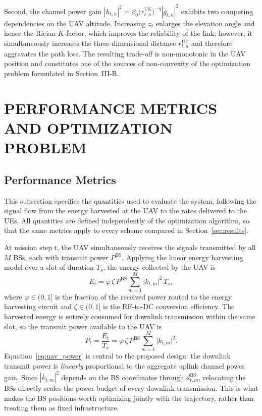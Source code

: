 \documentclass[conference]{IEEEtran}
\begin{document}
Second, the channel power gain
$|h_{t,n}|^{2}=\beta_{0}\big(r_{t,n}^{\mathrm{UE}}\big)^{-\eta}
|g_{t,n}|^{2}$ exhibits two competing dependencies on the UAV altitude.
Increasing $z_t$ enlarges the elevation angle and hence the Rician
$K$-factor, which improves the reliability of the link; however, it
simultaneously increases the three-dimensional distance
$r_{t,n}^{\mathrm{UE}}$ and therefore aggravates the path loss. The
resulting trade-off is non-monotonic in the UAV position and constitutes
one of the sources of non-convexity of the optimization problem
formulated in Section~III-B.



\section{PERFORMANCE METRICS AND OPTIMIZATION PROBLEM}

\subsection{Performance Metrics}
\label{subsec:performance_metrics}

This subsection specifies the quantities used to evaluate the system,
following the signal flow from the energy harvested at the UAV to the
rates delivered to the UEs. All quantities are defined independently of
the optimization algorithm, so that the same metrics apply to every
scheme compared in Section~\ref{sec:results}.

At mission step $t$, the UAV simultaneously receives the signals
transmitted by all $M$ BSs, each with transmit power $P^{\mathrm{BS}}$.
Applying the linear energy harvesting model over a slot of duration
$T_{s}$, the energy collected by the UAV is
\begin{equation}
\label{eq:harvested_energy}
E_{t}=\varphi\,\zeta\,P^{\mathrm{BS}}
      \sum_{m=1}^{M}\big|k_{t,m}\big|^{2}\,T_{s},
\end{equation}
where $\varphi\in(0,1]$ is the fraction of the received power routed to
the energy harvesting circuit and $\zeta\in(0,1]$ is the RF-to-DC
conversion efficiency. The harvested energy is entirely consumed for
downlink transmission within the same slot, so the transmit power
available to the UAV is
\begin{equation}
\label{eq:uav_power}
P_{t}=\frac{E_{t}}{T_{s}}
     =\varphi\,\zeta\,P^{\mathrm{BS}}
      \sum_{m=1}^{M}\big|k_{t,m}\big|^{2}.
\end{equation}
Equation~\eqref{eq:uav_power} is central to the proposed design: the
downlink transmit power is \emph{linearly} proportional to the aggregate
uplink channel power gain. Since $|k_{t,m}|^{2}$ depends on the BS
coordinates through $d_{t,m}^{\mathrm{BS}}$, relocating the BSs directly
scales the power budget of every downlink transmission. This is what
makes the BS positions worth optimizing jointly with the trajectory,
rather than treating them as fixed infrastructure.
\end{document}
